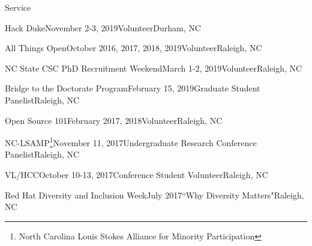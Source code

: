 \documentclass{resume} %
\begin{document}
\begin{rSection}{Service}

\begin{sSubsection}{Hack Duke}{November 2-3, 2019}{Volunteer}{Durham, NC}
\end{sSubsection}
\vspace{-5pt}
\begin{sSubsection}{All Things Open}{October 2016, 2017, 2018, 2019}{Volunteer}{Raleigh, NC}
\end{sSubsection}
\vspace{-5pt}
\begin{sSubsection}{NC State CSC PhD Recruitment Weekend}{March 1-2, 2019}{Volunteer}{Raleigh, NC}
\end{sSubsection}
\vspace{-5pt}
\begin{sSubsection}{Bridge to the Doctorate Program}{February 15, 2019}{Graduate Student Panelist}{Raleigh, NC}
\end{sSubsection}
\vspace{-5pt}
\begin{sSubsection}{Open Source 101}{February 2017, 2018}{Volunteer}{Raleigh, NC}
\end{sSubsection}
\vspace{-5pt}
\begin{sSubsection}{NC-LSAMP\footnote{North Carolina Louis Stokes Alliance for Minority Participation}}{November 11, 2017}{Undergraduate Research Conference Panelist}{Raleigh, NC}
\end{sSubsection}
\vspace{-5pt}
\begin{sSubsection}{VL/HCC}{October 10-13, 2017}{Conference Student Volunteer}{Raleigh, NC}
\end{sSubsection}
\vspace{-5pt}
\begin{sSubsection}{Red Hat Diversity and Inclusion Week}{July 2017}{``Why Diversity Matters"}{Raleigh, NC}
\end{sSubsection}
\vspace{-5pt}


\end{rSection}
\end{document}
